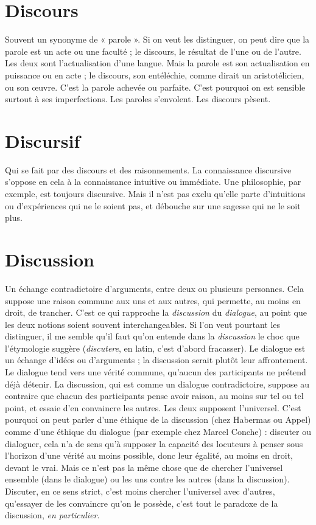 \section{Discours}
Souvent un synonyme de « parole ». Si on veut les distinguer,
on peut dire que la parole est un acte ou une faculté ; le discours,
le résultat de l’une ou de l’autre. Les deux sont l’actualisation d’une
langue. Mais la parole est son actualisation en puissance ou en acte ; le discours,
son entéléchie, comme dirait un aristotélicien, ou son œuvre. C’est la parole
achevée ou parfaite. C’est pourquoi on est sensible surtout à ses imperfections.
Les paroles s’envolent. Les discours pèsent.

\section{Discursif}
Qui se fait par des discours et des raisonnements. La connaissance
discursive s'oppose en cela à la connaissance intuitive ou
immédiate. Une philosophie, par exemple, est toujours discursive. Mais il n’est
pas exclu qu’elle parte d’intuitions ou d’expériences qui ne le soient pas, et
débouche sur une sagesse qui ne le soit plus.

\section{Discussion}
Un échange contradictoire d'arguments, entre deux ou plusieurs
personnes. Cela suppose une raison commune aux uns
et aux autres, qui permette, au moins en droit, de trancher. C’est ce qui rapproche
la {\it discussion} du {\it dialogue}, au point que les deux notions soient souvent
interchangeables. Si l'on veut pourtant les distinguer, il me semble qu’il faut
qu'on entende dans la {\it discussion} le choc que l’étymologie suggère ({\it discutere}, en
latin, c’est d’abord fracasser). Le dialogue est un échange d’idées ou d’arguments ;
la discussion serait plutôt leur affrontement. Le dialogue tend vers une vérité
commune, qu'aucun des participants ne prétend déjà détenir. La discussion, qui
est comme un dialogue contradictoire, suppose au contraire que chacun des participants
pense avoir raison, au moins sur tel ou tel point, et essaie d’en
convaincre les autres. Les deux supposent l’universel. C’est pourquoi on peut
parler d’une éthique de la discussion (chez Habermas ou Appel) comme d’une
éthique du dialogue (par exemple chez Marcel Conche) : discuter ou dialoguer,
cela n’a de sens qu’à supposer la capacité des locuteurs à penser sous l'horizon
d’une vérité au moins possible, donc leur égalité, au moins en droit, devant le
vrai. Mais ce n’est pas la même chose que de chercher l’universel ensemble (dans
le dialogue) ou les uns contre les autres (dans la discussion). Discuter, en ce sens
strict, c'est moins chercher l’universel avec d’autres, qu’essayer de les convaincre
qu’on le possède, c’est tout le paradoxe de la discussion, {\it en particulier}.


